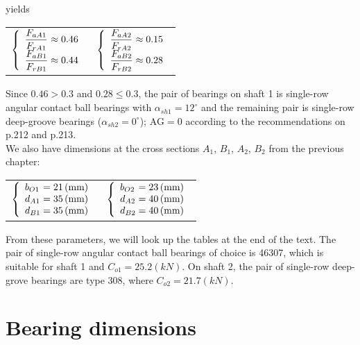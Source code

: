 yields\vskip2mm
{\centering
	\begin{tabular}[t]{p{6cm}p{7cm}}
		$
		\left\{ 
		\begin{array}{l@{{} \approx {}}l}
		\dfrac{F_{aA1}}{F_{rA1}} & 0.46 \\
		\dfrac{F_{aB1}}{F_{rB1}} & 0.44 \\
		\end{array}
		\right.$
		& $
		\left\{ 
		\begin{array}{l@{{} \approx {}}l}
		\dfrac{F_{aA2}}{F_{rA2}} & 0.15 \\
		\dfrac{F_{aB2}}{F_{rB2}} & 0.28 \\
		\end{array}
		\right.$
\end{tabular}}\vskip2mm
Since $ 0.46>0.3 $ and $ 0.28\leq0.3 $, the pair of bearings on shaft 1 is single-row angular contact ball bearings with $ \alpha_{sh1} = 12^\circ$ and the remaining pair is single-row deep-groove bearings ($ \alpha_{sh2} = 0^\circ $); $ \text{AG} = 0 $ according to the recommendations on p.212 and p.213.\\
We also have dimensions at the cross sections $ A_1 $, $ B_1 $, $ A_2 $, $ B_2 $ from the previous chapter:\vskip2mm
{\centering
	\begin{tabular}[t]{p{6cm}p{7cm}}
		$
		\left\{ 
		\begin{array}{l@{{} = {}}l}
		b_{O1} & 21\unit{(mm)}\\
		d_{A1} & 35\unit{(mm)}\\
		d_{B1} & 35\unit{(mm)}\\
		\end{array}
		\right.$
		& $
		\left\{ 
		\begin{array}{l@{{} = {}}l}
		b_{O2} & 23\unit{(mm)}\\
		d_{A2} & 40\unit{(mm)}\\
		d_{B2} & 40\unit{(mm)}\\
		\end{array}
		\right.$
\end{tabular}}\vskip2mm
From these parameters, we will look up the tables at the end of the text. The pair of single-row angular contact ball bearings of choice is 46307, which is suitable for shaft 1 and $ C_{o1} = 25.2\unit{(kN)} $. On shaft 2, the pair of single-row deep-grove bearings are type 308, where $ C_{o2}=21.7\unit{(kN)} $.

\section{Bearing dimensions}
